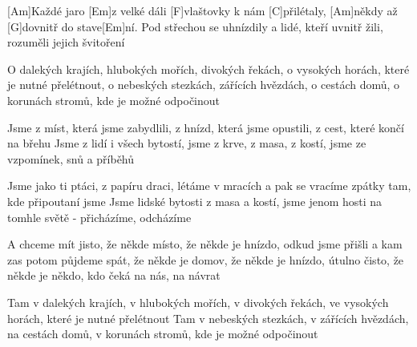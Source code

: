 
[Am]Každé jaro [Em]z velké dáli [F]vlaštovky k nám [C]přilétaly,
[Am]někdy až [G]dovnitř do stave[Em]ní.
Pod střechou se uhnízdily a lidé, kteří uvnitř žili,
rozuměli jejich švitoření

O dalekých krajích, hlubokých mořích, divokých řekách,
o vysokých horách, které je nutné přelétnout,
o nebeských stezkách, zářících hvězdách, o cestách domů,
o korunách stromů, kde je možné odpočinout

Jsme z míst, která jsme zabydlili,
z hnízd, která jsme opustili,
z cest, které končí na břehu
Jsme z lidí i všech bytostí,
jsme z krve, z masa, z kostí,
jsme ze vzpomínek, snů a příběhů

Jsme jako ti ptáci, z papíru draci, létáme v mracích
a pak se vracíme zpátky tam, kde připoutaní jsme
Jsme lidské bytosti z masa a kostí, jsme jenom hosti
na tomhle světě - přicházíme, odcházíme

A chceme mít jisto, že někde místo, že někde je hnízdo,
odkud jsme přišli a kam zas potom půjdeme spát,
že někde je domov, že někde je hnízdo, útulno čisto,
že někde je někdo, kdo čeká na nás, na návrat

Tam v dalekých krajích, v hlubokých mořích, v divokých řekách,
ve vysokých horách, které je nutné přelétnout
Tam v nebeských stezkách, v zářících hvězdách, na cestách domů,
v korunách stromů, kde je možné odpočinout\columnbreak